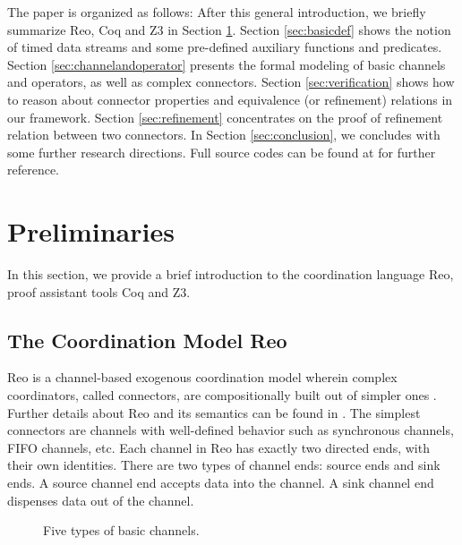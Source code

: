 \documentclass[3p,times]{elsarticle}
\begin{document}
The paper is organized as follows: After this general introduction, we briefly summarize Reo, Coq and Z3
in Section \ref{sec:pre}. Section \ref{sec:basicdef} shows the notion of timed data streams and some
pre-defined auxiliary functions and predicates. Section \ref{sec:channelandoperator} presents the
formal modeling of basic channels and operators, as well as complex connectors. Section
\ref{sec:verification} shows how to reason about connector properties and equivalence (or
refinement) relations in our framework. Section \ref{sec:refinement} concentrates on the proof of refinement relation between two connectors.
In Section \ref{sec:conclusion}, we concludes with some further research directions. Full source codes can be found at \cite{reo2coqfile} for further reference.

\section{Preliminaries}\label{sec:pre}

In this section, we provide a brief introduction to the coordination language Reo, proof assistant tools Coq and Z3.

\subsection{The Coordination Model Reo}
Reo is a channel-based exogenous coordination model wherein complex coordinators, called connectors,
are compositionally built out of simpler ones \cite{Arb04}.
Further details about Reo and its semantics can be found in \cite{Arb04,AR03,BSAR06}.
The simplest connectors are channels with well-defined behavior such as synchronous channels, FIFO channels, etc.
Each channel in Reo has exactly two directed ends, with their own identities.
There are two types of channel ends: source ends and sink ends. A source channel end accepts
data into the channel. A sink channel end dispenses data out of the channel.
\begin{figure}
  \centering
  \vspace{-6mm}
  \caption{Five types of basic channels.}\label{fig:basicchannel}
\end{figure}
\end{document}
